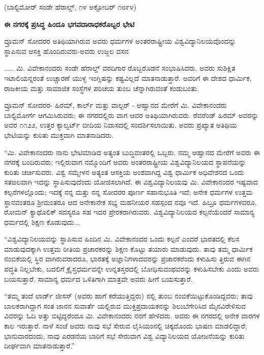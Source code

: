 \begin{center}
(ಬಾಲ್ಟಿಮೋರ್ ಸಂಡೇ ಹೆರಾಲ್ಡ್, ೧೪ ಅಕ್ಟೋಬರ್ ೧೮೯೪)
\end{center}

\begin{center}
\textbf{ಈ ನಗರಕ್ಕೆ ಪ್ರಸಿದ್ಧ ಹಿಂದೂ ಭಗವದಾರಾಧಕರೊಬ್ಬರ ಭೇಟಿ}
\end{center}

ವ್ರೂಮನ್ ಸೋದರರ ಅತಿಥಿಯಾಗಿರುವ ಅವರು ಧರ್ಮಗಳ ಅಂತರರಾಷ್ಟ್ರೀಯ ವಿಶ್ವವಿದ್ಯಾನಿಲಯವೊಂದನ್ನು ಸ್ಥಾಪಿಸುವ ಆಸಕ್ತಿ ಹೊಂದಿರುವರು-ಅವರು ಉಜ್ಜಲ ವಸನ

..... ಮಿ. ವಿವೇಕಾನಂದರು  ಸಂಡೇ ಹೆರಾಲ್ಡ್ ವರದಿಗಾರ ರೊಬ್ಬರೊಡನೆ ಸಂಭಾಷಿಸಿದರು. ಅವರು ಸುಶಿಕ್ಷಿತ ಇಟಾಲಿಯನ್ನರಂತೆ ಉಚ್ಚಾರಣೆ ಯುಳ್ಳ ಇಂಗ್ಲಿಷನ್ನು ಕಷ್ಟವಿಲ್ಲದೆ ಮಾತನಾಡುತ್ತಾರೆ. ಅವರಿಗೆ ಈ ದೇಶದ ಧಾರ್ಮಿಕ, ರಾಜಕೀಯ ಮತ್ತು ಸಾಮಾಜಿಕ ಸಂಸ್ಥೆಗಳ ಪರಿಚಯ ತುಂಬ ಚೆನ್ನಾಗಿರುವಂತೆ ಕಂಡುಬಂತು.

ವ್ರೂಮನ್ ಸೋದರರ- ಹಿರಮ್​, ಕಾರ್ಲ್ ಮತ್ತು ವಾಲ್ಟರ್ - ಆಹ್ವಾನದ ಮೇರೆಗೆ ಮಿ. ವಿವೇಕಾನಂದರು ಬಾಲ್ಟಿಮೋರ್ಗೆ ಆಗಮಿಸಿರುವರು; ಈ ನಗರದಲ್ಲಿರು ವಾಗ ಆವರ ಅತಿಥಿಯಾಗಿರುವರು. ರೆವರೆಂಡ್ ಹಿರಮ್​ ಅವರನ್ನು ಅವರ ೧೧೨೨, ಉತ್ತರ ಕ್ಯಾಲ್ವರ್ಟ್ ಬೀದಿಯ ನಿವಾಸದಲ್ಲಿ ಸಂದರ್ಶಿಸಲಾಯಿತು. ಅವರು ಪ್ರಖ್ಯಾತ ಅತಿಥಿಯ ಭೇಟಿಯನ್ನು ಕುರಿತು ಮುಕ್ತವಾಗಿ ಮಾತನಾಡಿದರು.

“ಮಿ. ವಿವೇಕಾನಂದರು ನಾನು ಭೇಟಿಮಾಡಿದ ಅತ್ಯಂತ ಬುದ್ಧಿವಂತರಲ್ಲಿ ಒಬ್ಬರು. ನಮ್ಮ ಆಹ್ವಾನದ ಮೇರೆಗೆ ಅವರು ಈ ನಗರಕ್ಕೆ ಬಂದಿರುವರು; ಇಲ್ಲಿರುವಾಗ ನಮ್ಮೊಂದಿಗೆ ಅವರು ಅಂತರರಾಷ್ಟ್ರೀಯ ವಿಶ್ವವಿದ್ಯಾನಿಲಯದ ಸ್ಥಾಪನೆಯನ್ನು ಕುರಿತು ಚರ್ಚಿಸುವರು. ವಿಶ್ವ ಸಮ್ಮೇಳನ ಅತ್ಯಂತ ಆಸಕ್ತಿಯ ಅಂಶವಾಗಿದ್ದ ವಿಶ್ವ ಧಾರ್ಮಿಕ ಅಧಿವೇಶನದ ಒಂದು ಸತಙಲವಾಗಿ ಇದನ್ನು ಸ್ಥಾಪಿಸುವುದೆಂದು ಯೋಜಿಸಲಾಗಿದೆ. ಈ ವಿಶ್ವವಿದ್ಯಾನಿಲಯವು ಮಿ. ವಿವೇಕಾನಂದರ ಇಷ್ಟವಾದ ಕಲ್ಪನೆಗಳಲ್ಲೊಂದು; ಇದಕ್ಕೆ ನನ್ನ ಮತ್ತು ನನ್ನ ಸೋದರರ ಪೂರ್ಣ ಸಹಾನುಭೂತಿ ಇದೆ; ಅನೇಕ ಧರ್ಮಗಳ ಉತ್ತಮ ಸ್ಥಾನವಂತರೂ ಶ‍್ರೀಮಂತರೂ ಆದ ಅನೇಕಾನೇಕ ಸಭ್ಯ ಮಹನೀಯರ ಸಹಸ್ಪಂದ ನವೂ ಇದೆ. ಹಿಬ್ರೂ ಧರ್ಮಗಳವರೂ, ರೋಮನ್ ಕ್ಯಾಥೊಲಿಕ್ ಸದಸ್ಯರೂ ಸಹ ಇದರ ಪ್ರೇರಕರಾಗಿರುವರು. ವಿಶ್ವವಿದ್ಯಾನಿಲಯದ ಕಲ್ಪನೆಯೆಂದರೆ ಸಾಮಾನ್ಯ ಧರ್ಮದಲ್ಲಿ ಶಿಕ್ಷಣ ಕೊಡುವುದು...

“ವಿಶ್ವವಿದ್ಯಾನಿಲಯವನ್ನು ಸ್ಥಾಪಿಸುವ ಹಿಂದಿನ ಮಿ. ವಿವೇಕಾನಂದರ ಒಂದು ಕಲ್ಪನೆ ಎಂದರೆ ಭಾರತದಲ್ಲಿ ಕೆಲಸ ಮಾಡುವುದಕ್ಕಾಗಿ ಉತ್ತಮ ರೀತಿಯ ಪ್ರಚಾರಕರನ್ನು ಶಿಕ್ಷಣ ಕೊಟ್ಟು ತಯಾರು ಮಾಡುವುದು. ತಾವು ತಮ್ಮ ಧಾರ್ಮಿಕ ನಂಬಿಕೆಯಲ್ಲಿ ಸ್ಥಿರ ವಾಗಿರುವರಾದರೂ, ಭಾರತಕ್ಕೆ ಅಜ್ಞಾನಿಗಳಾದವರನ್ನು ಪ್ರಚಾರಕರೆಂದು ಕಳುಹಿಸು ತ್ತಿರುವ ಈಗಿನ ಪದ್ಧತಿ ನಿಲ್ಲಬೇಕು, ಬದಲಿಗೆ ಕ್ರೈಸ್ತಧರ್ಮವನ್ನೇ ಉನ್ನತಸ್ತರದಲ್ಲಿ ಬೋಧಿಸುವಂಥವರನ್ನು ಕಳುಹಿಸಬೇಕು ಎಂದು ಅವರು ಬಯಸುತ್ತಾರೆ. ಸಾಮಾನ್ಯ ಧರ್ಮದ ಒಳಿತಿಗಾಗಿ ಮಾತ್ರವೇ ಅವರು ಹೀಗೆ ಬಯಸುತ್ತಾರೆ.

“ತಮ್ಮ ತಂದೆ ಲಾರ್ಡ್ ಜೀಸಸ್ (ಅವರು ಹಾಗೆ ಕರೆಯುತ್ತಿದ್ದರು) ನಲ್ಲಿ ತುಂಬ ನಂಬಿಕೆಯಿಟ್ಟುಕೊಂಡಿದ್ದವರು; ತಾವು ಬಾಲಕರಾಗಿದ್ದಾಗ ಸಂತ ಜಾನನ ಸುವಾರ್ತೆ ಯಲ್ಲಿರುವ ಮುಕ್ತಿಪ್ರದಾಯಕನನ್ನು ಶಿಲುಬೆಗೇರಿಸಿದ ಮೈನವಿರೇಳಿಸುವ ವಿವರನ್ನು ಓದಿ ಅತ್ತು ಬಿಟ್ಟಿದ್ದರೆಂದೂ ಮಿ. ವಿವೇಕಾನಂದರು ನನಗೆ ಹೇಳಿದರು. ಅವರು ಈ ನಗರದಲ್ಲಿ ಅನೇಕ ವಾರಗಳ ಕಾಲ ಇರುತ್ತಾರೆ. ನಾಳೆ ಸಂಜೆ ಅವರು ನಾವು ಸಭೆ ಸೇರುವ ಲೈಸಿಯಂನಲ್ಲಿ ಚಿಕ್ಕದೊಂದು ಭಾಷಣ ಮಾಡಲಿದ್ದಾರೆ; ಭಾನುವಾರದಂದು, ನಾವು ಎರಡನೆಯ ಬಾರಿಗೆ ಸಭೆ ಸೇರುವಾಗ ವಿಶ್ವ ವಿದ್ಯಾನಿಲಯದ ಯೋಜನೆಯನ್ನು ಕುರಿತು ದೀರ್ಘವಾಗಿ ಮಾತನಾಡುತ್ತಾರೆ.”


